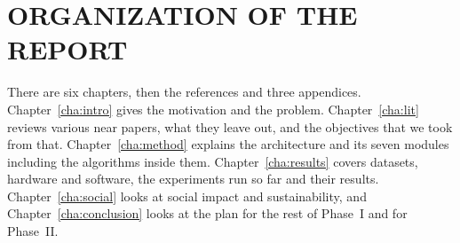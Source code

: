 \section{ORGANIZATION OF THE REPORT}

There are six chapters, then the references and three appendices.
Chapter~\ref{cha:intro} gives the motivation and the problem. Chapter~\ref{cha:lit}
reviews various near papers, what they leave out, and the objectives that we took from
that. Chapter~\ref{cha:method} explains the architecture and its seven modules including
the algorithms inside them. Chapter~\ref{cha:results} covers datasets, hardware and
software, the experiments run so far and their results. Chapter~\ref{cha:social} looks
at social impact and sustainability, and Chapter~\ref{cha:conclusion} looks at the plan
for the rest of Phase~I and for Phase~II.
